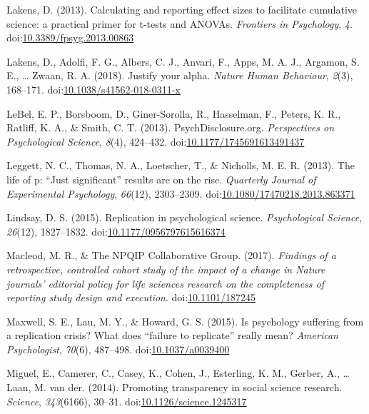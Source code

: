 \documentclass[english,,man,mask]{apa6}
\theoremstyle{definition}
\theoremstyle{definition}
\theoremstyle{definition}
\theoremstyle{remark}
\begin{document}
\hypertarget{ref-Lakens2013}{}
Lakens, D. (2013). Calculating and reporting effect sizes to facilitate
cumulative science: a practical primer for t-tests and ANOVAs.
\emph{Frontiers in Psychology}, \emph{4}.
doi:\href{https://doi.org/10.3389/fpsyg.2013.00863}{10.3389/fpsyg.2013.00863}

\hypertarget{ref-Lakens2018}{}
Lakens, D., Adolfi, F. G., Albers, C. J., Anvari, F., Apps, M. A. J.,
Argamon, S. E., \ldots{} Zwaan, R. A. (2018). Justify your alpha.
\emph{Nature Human Behaviour}, \emph{2}(3), 168--171.
doi:\href{https://doi.org/10.1038/s41562-018-0311-x}{10.1038/s41562-018-0311-x}

\hypertarget{ref-LeBel2013}{}
LeBel, E. P., Borsboom, D., Giner-Sorolla, R., Hasselman, F., Peters, K.
R., Ratliff, K. A., \& Smith, C. T. (2013). PsychDisclosure.org.
\emph{Perspectives on Psychological Science}, \emph{8}(4), 424--432.
doi:\href{https://doi.org/10.1177/1745691613491437}{10.1177/1745691613491437}

\hypertarget{ref-Leggett}{}
Leggett, N. C., Thomas, N. A., Loetscher, T., \& Nicholls, M. E. R.
(2013). The life of p: ``Just significant'' results are on the rise.
\emph{Quarterly Journal of Experimental Psychology}, \emph{66}(12),
2303--2309.
doi:\href{https://doi.org/10.1080/17470218.2013.863371}{10.1080/17470218.2013.863371}

\hypertarget{ref-Lindsay2015}{}
Lindsay, D. S. (2015). Replication in psychological science.
\emph{Psychological Science}, \emph{26}(12), 1827--1832.
doi:\href{https://doi.org/10.1177/0956797615616374}{10.1177/0956797615616374}

\hypertarget{ref-Macleod2017}{}
Macleod, M. R., \& The NPQIP Collaborative Group. (2017). \emph{Findings
of a retrospective, controlled cohort study of the impact of a change in
Nature journals' editorial policy for life sciences research on the
completeness of reporting study design and execution}.
doi:\href{https://doi.org/10.1101/187245}{10.1101/187245}

\hypertarget{ref-Maxwell2015}{}
Maxwell, S. E., Lau, M. Y., \& Howard, G. S. (2015). Is psychology
suffering from a replication crisis? What does ``failure to replicate''
really mean? \emph{American Psychologist}, \emph{70}(6), 487--498.
doi:\href{https://doi.org/10.1037/a0039400}{10.1037/a0039400}

\hypertarget{ref-Miguel2014}{}
Miguel, E., Camerer, C., Casey, K., Cohen, J., Esterling, K. M., Gerber,
A., \ldots{} Laan, M. van der. (2014). Promoting transparency in social
science research. \emph{Science}, \emph{343}(6166), 30--31.
doi:\href{https://doi.org/10.1126/science.1245317}{10.1126/science.1245317}
\end{document}

